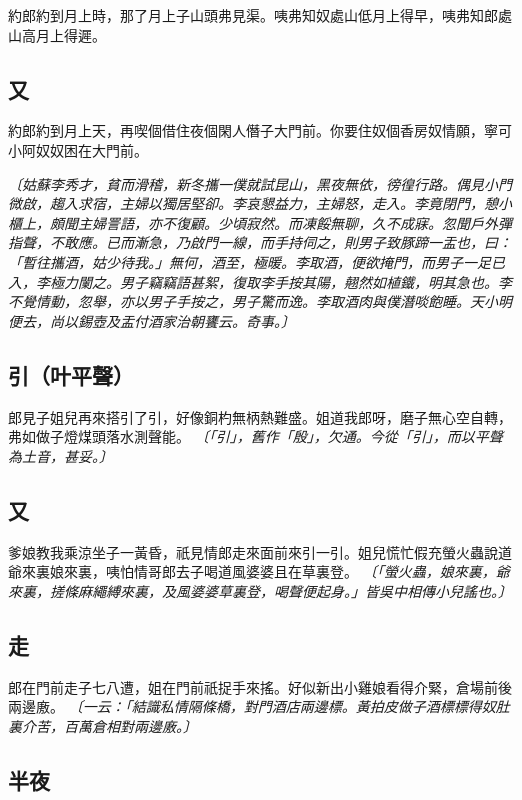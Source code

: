 約郎約到月上時，那了月上子山頭弗見渠。咦弗知奴處山低月上得早，咦弗知郎處山高月上得遲。

\subsection*{又}

約郎約到月上天，再喫個借住夜個閑人僭子大門前。你要住奴個香房奴情願，寧可小阿奴奴困在大門前。

\textit{〔姑蘇李秀才，貧而滑稽，新冬攜一僕就試昆山，黑夜無依，徬徨行路。偶見小門微啟，趨入求宿，主婦以獨居堅卻。李哀懇益力，主婦怒，走入。李竟閉門，憩小櫃上，頗聞主婦詈語，亦不復顧。少頃寂然。而凍餒無聊，久不成寐。忽聞戶外彈指聲，不敢應。已而漸急，乃啟門一線，而手持伺之，則男子致豚蹄一盂也，曰：「暫往攜酒，姑少待我。」無何，酒至，極暖。李取酒，便欲掩門，而男子一足已入，李極力闌之。男子竊竊語甚絮，復取李手按其陽，翹然如植鐵，明其急也。李不覺情動，忽舉，亦以男子手按之，男子驚而逸。李取酒肉與僕潛啖飽睡。天小明便去，尚以錫壺及盂付酒家治朝饔云。奇事。〕}

\subsection*{引（叶平聲）}

郎見子姐兒再來搭引了引，好像銅杓無柄熱難盛。姐道我郎呀，磨子無心空自轉，弗如做子燈煤頭落水測聲能。
\textit{〔「引」，舊作「殷」，欠通。今從「引」，而以平聲為土音，甚妥。〕}

\subsection*{又}

爹娘教我乘涼坐子一黃昏，祇見情郎走來面前來引一引。姐兒慌忙假充螢火蟲說道爺來裏娘來裏，咦怕情哥郎去子喝道風婆婆且在草裏登。
\textit{〔「螢火蟲，娘來裏，爺來裏，搓條麻繩縛來裏，及風婆婆草裏登，喝聲便起身。」皆吳中相傳小兒謠也。〕}

\subsection*{走}

郎在門前走子七八遭，姐在門前祇捉手來搖。好似新出小雞娘看得介緊，倉場前後兩邊廒。
\textit{〔一云：「結識私情隔條橋，對門酒店兩邊標。黃拍皮做子酒標標得奴肚裏介苦，百萬倉相對兩邊廒。〕}

\subsection*{半夜}

